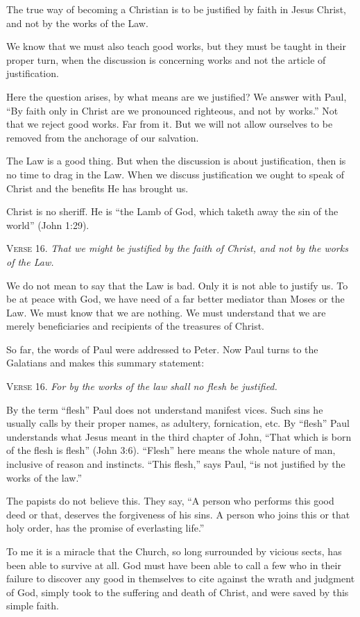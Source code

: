 The true way of becoming a Christian is to be justified by faith in Jesus Christ, and not by the works of the Law.

We know that we must also teach good works, but they must be taught in their proper turn, when the discussion is concerning works and not the article of justification.

Here the question arises, by what means are we justified? We answer with Paul, “By faith only in Christ are we pronounced righteous, and not by works.” Not that we reject good works. Far from it. But we will not allow ourselves to be removed from the anchorage of our salvation.

The Law is a good thing. But when the discussion is about justification, then is no time to drag in the Law. When we discuss justification we ought to speak of Christ and the benefits He has brought us.

Christ is no sheriff. He is “the Lamb of God, which taketh away the sin of the world” (John 1:29).

\textsc{Verse} 16. \emph{That we might be justified by the faith of Christ, and not by the works of the Law.}

We do not mean to say that the Law is bad. Only it is not able to justify us. To be at peace with God, we have need of a far better mediator than Moses or the Law. We must know that we are nothing. We must understand that we are merely beneficiaries and recipients of the treasures of Christ.

So far, the words of Paul were addressed to Peter. Now Paul turns to the Galatians and makes this summary statement:

\textsc{Verse} 16. \emph{For by the works of the law shall no flesh be justified.}

By the term “flesh” Paul does not understand manifest vices. Such sins he usually calls by their proper names, as adultery, fornication, etc. By “flesh” Paul understands what Jesus meant in the third chapter of John, “That which is born of the flesh is flesh” (John 3:6). “Flesh” here means the whole nature of man, inclusive of reason and instincts. “This flesh,” says Paul, “is not justified by the works of the law.”

The papists do not believe this. They say, “A person who performs this good deed or that, deserves the forgiveness of his sins. A person who joins this or that holy order, has the promise of everlasting life.”

To me it is a miracle that the Church, so long surrounded by vicious sects, has been able to survive at all. God must have been able to call a few who in their failure to discover any good in themselves to cite against the wrath and judgment of God, simply took to the suffering and death of Christ, and were saved by this simple faith.

